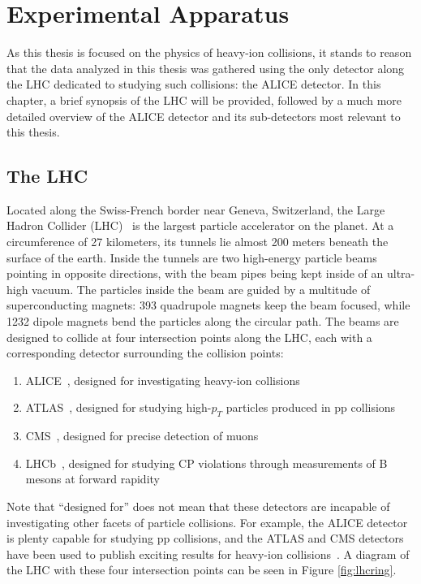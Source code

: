 \chapter{Experimental Apparatus}
\label{ch:experiment}

As this thesis is focused on the physics of heavy-ion collisions, it stands to reason that the data analyzed in this thesis was gathered using the only detector along the LHC dedicated to studying such collisions: the ALICE detector. In this chapter, a brief synopsis of the LHC will be provided, followed by a much more detailed overview of the ALICE detector and its sub-detectors most relevant to this thesis.

\section{The LHC}
Located along the Swiss-French border near Geneva, Switzerland, the Large Hadron Collider (LHC)~\cite{LHC1, LHC2} is the largest particle accelerator on the planet. At a circumference of 27 kilometers, its tunnels lie almost 200 meters beneath the surface of the earth. Inside the tunnels are two high-energy particle beams pointing in opposite directions, with the beam pipes being kept inside of an ultra-high vacuum.
The particles inside the beam are guided by a multitude of superconducting magnets: 393 quadrupole magnets keep the beam focused, while 1232 dipole magnets bend the particles along the circular path. 
The beams are designed to collide at four intersection points along the LHC, each with a corresponding detector surrounding the collision points: 
\begin{enumerate}
\item ALICE~\cite{ALICE}, designed for investigating heavy-ion collisions
\item ATLAS~\cite{ATLAS}, designed for studying high-$p_{T}$ particles produced in pp collisions 
\item CMS~\cite{CMS},   designed for precise detection of muons
\item LHCb~\cite{LHCb}, designed for studying CP violations through measurements of B mesons at forward rapidity
\end{enumerate}
Note that ``designed for'' does not mean that these detectors are incapable of investigating other facets of particle collisions. For example, the ALICE detector is plenty capable for studying pp collisions\cite{ALICEpp1, ALICEpp2}, and the ATLAS and CMS detectors have been used to publish exciting results for heavy-ion collisions~\cite{CMSHeavy1, ATLASHeavy1}. A diagram of the LHC with these four intersection points can be seen in Figure \ref{fig:lhcring}.
